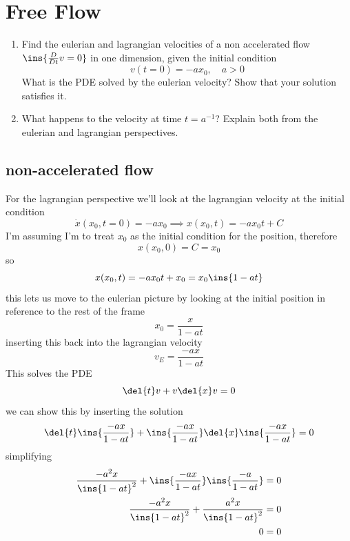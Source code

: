\clearpage
\section{Free Flow}
\begin{colbox}
    \begin{enumerate}
        \item Find the eulerian and lagrangian velocities of a non accelerated flow \(\ins{\frac{D}{Dt}v=0}\) in one dimension, given the initial condition \begin{equation}
            v(t=0)=-ax_0,\quad a>0
        \end{equation}
        What is the PDE solved by the eulerian velocity? Show that your solution satisfies it.
        \item What happens to the velocity at time \(t=a^{-1}\)? Explain both from the eulerian and lagrangian perspectives.
    \end{enumerate}
\end{colbox}
\subsection{non-accelerated flow}
For the lagrangian perspective we'll look at the lagrangian velocity at the initial condition
\begin{equation}
    \dot{x}(x_0, t=0) = -ax_0 \implies x(x_0,t) = -ax_0t+C
\end{equation}
I'm assuming I'm to treat \(x_0\) as the initial condition for the position, therefore 
\begin{equation}
    x(x_0,0) = C = x_0
\end{equation}
so
\begin{equation}
    x(x_0,t) = -ax_0t+x_0 = x_0\ins{1-at}
\end{equation}
this lets us move to the eulerian picture by looking at the initial position in reference to the rest of the frame
\begin{equation}
    x_0 = \frac{x}{1-at}
\end{equation}
inserting this back into the lagrangian velocity
\begin{equation}
    v_E = \frac{-ax}{1-at}
\end{equation}
This solves the PDE
\begin{equation}
    \del{t}v+v\del{x}v=0
\end{equation}
we can show this by inserting the solution
\begin{equation}
    \del{t}\ins{\frac{-ax}{1-at}}+\ins{\frac{-ax}{1-at}}\del{x}\ins{\frac{-ax}{1-at}}=0
\end{equation}
simplifying
\begin{align}
    \frac{-a^2x}{\ins{1-at}^2}+\ins{\frac{-ax}{1-at}}\ins{\frac{-a}{1-at}}&=0\\
    \frac{-a^2x}{\ins{1-at}^2}+\frac{a^2x}{\ins{1-at}^2}&=0\\
    0&=0
\end{align}
